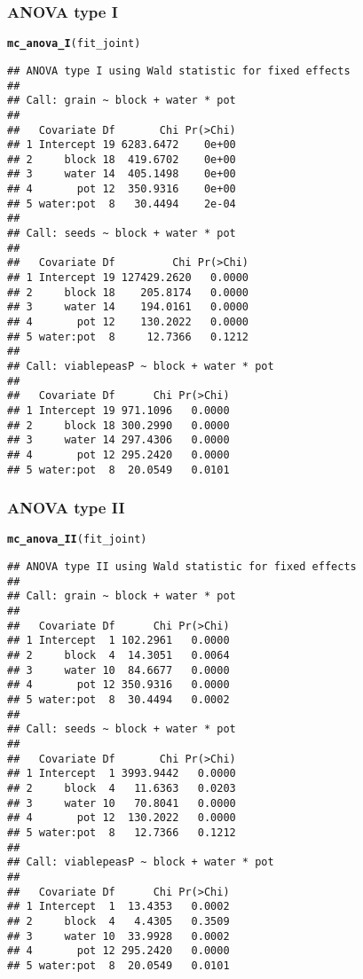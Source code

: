 \documentclass[article]{jss}\usepackage[]{graphicx}\usepackage[]{xcolor}
\makeatletter
\newcommand{\hlstd}[1]{\textcolor[rgb]{0.345,0.345,0.345}{#1}}%
\newcommand{\hlkwd}[1]{\textcolor[rgb]{0.737,0.353,0.396}{\textbf{#1}}}%
\newenvironment{kframe}{%
 \def\at@end@of@kframe{}%
 \ifinner\ifhmode%
  \def\at@end@of@kframe{\end{minipage}}%
  \begin{minipage}{\columnwidth}%
 \fi\fi%
 \def\FrameCommand##1{\hskip\@totalleftmargin \hskip-\fboxsep
 \colorbox{shadecolor}{##1}\hskip-\fboxsep
     \hskip-\linewidth \hskip-\@totalleftmargin \hskip\columnwidth}%
 \MakeFramed {\advance\hsize-\width
   \@totalleftmargin\z@ \linewidth\hsize
   \@setminipage}}%
 {\par\unskip\endMakeFramed%
 \at@end@of@kframe}
\newenvironment{knitrout}{}{} %
\makeatother
\begin{document}
\subsubsection{ANOVA type I}
 
\begin{knitrout}
\color{fgcolor}\begin{kframe}
\begin{alltt}
\hlkwd{mc_anova_I}\hlstd{(fit_joint)}
\end{alltt}
\begin{verbatim}
## ANOVA type I using Wald statistic for fixed effects
## 
## Call: grain ~ block + water * pot
## 
##   Covariate Df       Chi Pr(>Chi)
## 1 Intercept 19 6283.6472    0e+00
## 2     block 18  419.6702    0e+00
## 3     water 14  405.1498    0e+00
## 4       pot 12  350.9316    0e+00
## 5 water:pot  8   30.4494    2e-04
## 
## Call: seeds ~ block + water * pot
## 
##   Covariate Df         Chi Pr(>Chi)
## 1 Intercept 19 127429.2620   0.0000
## 2     block 18    205.8174   0.0000
## 3     water 14    194.0161   0.0000
## 4       pot 12    130.2022   0.0000
## 5 water:pot  8     12.7366   0.1212
## 
## Call: viablepeasP ~ block + water * pot
## 
##   Covariate Df      Chi Pr(>Chi)
## 1 Intercept 19 971.1096   0.0000
## 2     block 18 300.2990   0.0000
## 3     water 14 297.4306   0.0000
## 4       pot 12 295.2420   0.0000
## 5 water:pot  8  20.0549   0.0101
\end{verbatim}
\end{kframe}
\end{knitrout}

\subsubsection{ANOVA type II}

\begin{knitrout}
\color{fgcolor}\begin{kframe}
\begin{alltt}
\hlkwd{mc_anova_II}\hlstd{(fit_joint)}
\end{alltt}
\begin{verbatim}
## ANOVA type II using Wald statistic for fixed effects
## 
## Call: grain ~ block + water * pot
## 
##   Covariate Df      Chi Pr(>Chi)
## 1 Intercept  1 102.2961   0.0000
## 2     block  4  14.3051   0.0064
## 3     water 10  84.6677   0.0000
## 4       pot 12 350.9316   0.0000
## 5 water:pot  8  30.4494   0.0002
## 
## Call: seeds ~ block + water * pot
## 
##   Covariate Df       Chi Pr(>Chi)
## 1 Intercept  1 3993.9442   0.0000
## 2     block  4   11.6363   0.0203
## 3     water 10   70.8041   0.0000
## 4       pot 12  130.2022   0.0000
## 5 water:pot  8   12.7366   0.1212
## 
## Call: viablepeasP ~ block + water * pot
## 
##   Covariate Df      Chi Pr(>Chi)
## 1 Intercept  1  13.4353   0.0002
## 2     block  4   4.4305   0.3509
## 3     water 10  33.9928   0.0002
## 4       pot 12 295.2420   0.0000
## 5 water:pot  8  20.0549   0.0101
\end{verbatim}
\end{kframe}
\end{knitrout}
\end{document}
